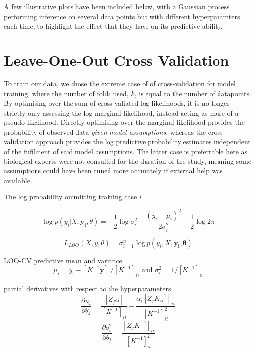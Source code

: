 %  


A few illustrative plots have been included below, with a Gaussian process performing inference on several data points but with different hyperparamters each time, to highlight the effect that they have on its predictive ability.

\section{Leave-One-Out Cross Validation}


To train our data, we chose the extreme case of of cross-validation for model training, where the number of folds used, $k$, is equal to the number of datapoints. By optimising over the sum of cross-valiated log likelihoods, it is no longer strictly only assessing the log marginal likelihood, instead acting as more of a pseudo-likelihood. Directly optimising over the marginal likelihood provides the probability of observed data \textit{given model assumptions}, whereas the cross-validation approach provides the log predictive probability estimates independent of the fufilment of said model assumptions. The latter case is preferrable here as biological experts were not consulted for the duration of the study, meaning some assumptions could have been tuned more accurately if external help was available.

The log probability ommitting training case $i$

$$\log p(y_i|X, \mathbf{y_i}, \theta) = -\frac{1}{2}\log\sigma^2_i - \frac{(y_i - \mu_i)^2}{2 \sigma^2_i} - \frac{1}{2}\log2\pi$$

$$ L_{LOO}(X, y, \theta) = \sigma^n_{i=1} \log p(y_i, X, \mathbf{y_i}, \mathbf{\theta})$$

LOO-CV predictive mean and variance
$$\mu_i= y_i - [K^{-1}\mathbf{y}]_i / [K^{-1}]_{ii} \text{ and } \sigma_i^2 = 1/[K^{-1}]_{ii}$$

partial derivatives with respect to the hyperparameters
$$\frac{\partial{u_i}}{\partial{\theta_j}} = \frac{[Z_j \alpha]}{[K^{-1}]_{ii}} - \frac{\alpha_i[Z_j K^{-1}_{ii}]_{ii}}{[K^{-1}]^2_{ii}}$$
$$\frac{\partial{\sigma_i^2}}{\partial{\theta_j}} = \frac{[Z_jK^{-1}]_{ii}}{[K^{-1}]^2_{ii}}$$

